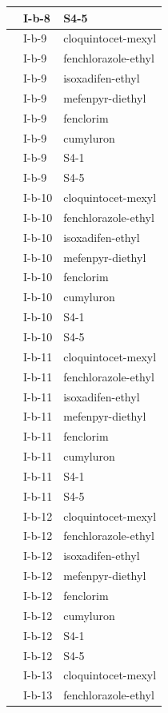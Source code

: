 \documentclass[11pt,a4paper]{article}
\begin{document}
\begin{table}[h]
\begin{tabular}{|l|l|l|}
 & I-b-8 & S4-5 \\ \hline
 & I-b-9 & cloquintocet-mexyl \\ \hline
 & I-b-9 & fenchlorazole-ethyl \\ \hline
 & I-b-9 & isoxadifen-ethyl \\ \hline
 & I-b-9 & mefenpyr-diethyl \\ \hline
 & I-b-9 & fenclorim \\ \hline
 & I-b-9 & cumyluron \\ \hline
 & I-b-9 & S4-1 \\ \hline
 & I-b-9 & S4-5 \\ \hline
 & I-b-10 & cloquintocet-mexyl \\ \hline
 & I-b-10 & fenchlorazole-ethyl \\ \hline
 & I-b-10 & isoxadifen-ethyl \\ \hline
 & I-b-10 & mefenpyr-diethyl \\ \hline
 & I-b-10 & fenclorim \\ \hline
 & I-b-10 & cumyluron \\ \hline
 & I-b-10 & S4-1 \\ \hline
 & I-b-10 & S4-5 \\ \hline
 & I-b-11 & cloquintocet-mexyl \\ \hline
 & I-b-11 & fenchlorazole-ethyl \\ \hline
 & I-b-11 & isoxadifen-ethyl \\ \hline
 & I-b-11 & mefenpyr-diethyl \\ \hline
 & I-b-11 & fenclorim \\ \hline
 & I-b-11 & cumyluron \\ \hline
 & I-b-11 & S4-1 \\ \hline
 & I-b-11 & S4-5 \\ \hline
 & I-b-12 & cloquintocet-mexyl \\ \hline
 & I-b-12 & fenchlorazole-ethyl \\ \hline
 & I-b-12 & isoxadifen-ethyl \\ \hline
 & I-b-12 & mefenpyr-diethyl \\ \hline
 & I-b-12 & fenclorim \\ \hline
 & I-b-12 & cumyluron \\ \hline
 & I-b-12 & S4-1 \\ \hline
 & I-b-12 & S4-5 \\ \hline
 & I-b-13 & cloquintocet-mexyl \\ \hline
 & I-b-13 & fenchlorazole-ethyl \\ \hline

\end{tabular}
\end{table}
\end{document}
